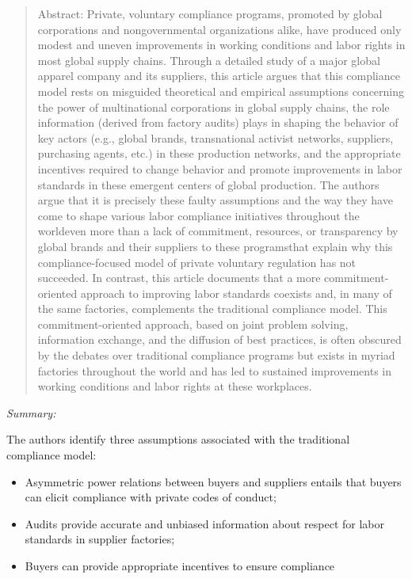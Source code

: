 \documentclass[
  12pt,
]{article}
\providecommand{\tightlist}{%
  \setlength{\itemsep}{0pt}\setlength{\parskip}{0pt}}
\begin{document}
\bigbreak


\begin{quote}
Abstract: 
Private, voluntary compliance programs, promoted by global corporations and nongovernmental organizations alike, have produced only modest and uneven improvements in working conditions and labor rights in most global supply chains. Through a detailed study of a major global apparel company and its suppliers, this article argues that this compliance model rests on misguided theoretical and empirical assumptions concerning the power of multinational corporations in global supply chains, the role information (derived from factory audits) plays in shaping the behavior of key actors (e.g., global brands, transnational activist networks, suppliers, purchasing agents, etc.) in these production networks, and the appropriate incentives required to change behavior and promote improvements in labor standards in these emergent centers of global production. The authors argue that it is precisely these faulty assumptions and the way they have come to shape various labor compliance initiatives throughout the world\textemdash even more than a lack of commitment, resources, or transparency by global brands and their suppliers to these programs\textemdash that explain why this compliance-focused model of private voluntary regulation has not succeeded. In contrast, this article documents that a more commitment-oriented approach to improving labor standards coexists and, in many of the same factories, complements the traditional compliance model. This commitment-oriented approach, based on joint problem solving, information exchange, and the diffusion of best practices, is often obscured by the debates over traditional compliance programs but exists in myriad factories throughout the world and has led to sustained improvements in working conditions and labor rights at these workplaces.
\end{quote}

\emph{Summary:}

The authors identify three assumptions associated with the traditional
compliance model:

\begin{itemize}
\tightlist
\item
  Asymmetric power relations between buyers and suppliers entails that
  buyers can elicit compliance with private codes of conduct;
\item
  Audits provide accurate and unbiased information about respect for
  labor standards in supplier factories;
\item
  Buyers can provide appropriate incentives to ensure compliance
\end{itemize}
\end{document}
